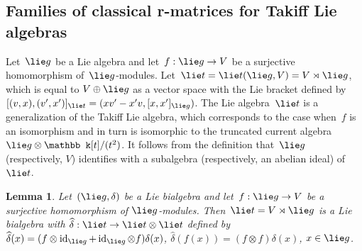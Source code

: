 \documentclass[12pt, reqno]{amsart}
\newcommand{\wh}[1]{\widehat{#1}}
\newtheorem{lemma}[theorem]{Lemma}
\theoremstyle{definition}
\numberwithin{equation}{section}
\newcommand{\tensor}{\otimes}
\DeclareMathOperator{\id}{id}
\begin{document}
\subsection{Families of classical r-matrices for Takiff
Lie algebras}\label{subs:Takiff}
Let~$\lie g$ be a Lie algebra and let~$f:\lie g\to V$ be a surjective
homomorphism of~$\lie g$-modules. Let~$\lie t=\lie t(\lie g,V)=V\rtimes \lie g$, which is equal to $V\oplus \lie g$ as a vector space with the Lie bracket
defined by $[(v,x),(v',x')]_{\lie t}=(xv'-x'v,[x,x']_{\lie g})$. The Lie algebra~$\lie t$ is a generalization 
of the Takiff Lie algebra, which corresponds to the case when~$f$ is an isomorphism and in turn is isomorphic to the truncated current algebra $\lie g\tensor \mathbb k[t]/(t^2)$.
It follows from the definition that~$\lie g$ (respectively, $V$) identifies with a subalgebra (respectively, an abelian ideal) of~$\lie t$.
\begin{lemma}
Let~$(\lie g,\delta)$ be a Lie bialgebra and let~$f:\lie g\to V$ be a surjective homomorphism of $\lie g$-modules.
Then~$\lie t=V\rtimes \lie g$ is a Lie bialgebra with
$\wh\delta:\lie t\to \lie t\tensor\lie t$ defined by
$\wh\delta(x)=(f\tensor\id_{\lie g}+\id_{\lie g}\tensor f)\delta(x)$, $\wh\delta(f(x))=(f\tensor f)\delta(x)$,
$x\in\lie g$.
\end{lemma}
\end{document}
